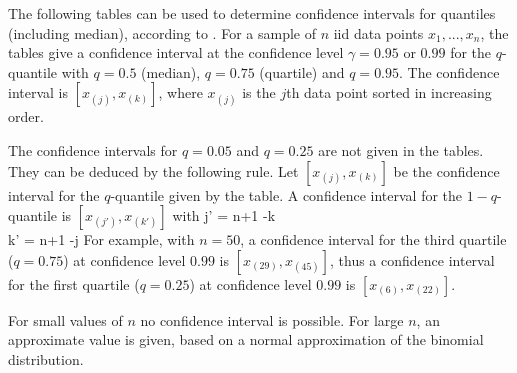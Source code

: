  The following tables can be used to determine confidence
 intervals for quantiles (including median),
 according to
 .
%
For a sample of $n$ iid data points
$x_1,...,x_n$, the tables give a confidence
interval at the confidence level $\gamma=0.95$ or
$0.99$ for the $q$-quantile with $q=0.5$
(median), $q=0.75$ (quartile) and $q=0.95$. The
confidence interval is $[x_{(j)},x_{(k)}]$, where
$x_{(j)}$ is the $j$th data point sorted in
increasing order.

The confidence intervals for $q=0.05$ and $q=0.25$ are not given
in the tables. They can be deduced by the following rule. Let
$[x_{(j)},x_{(k)}]$ be the confidence interval for the
$q$-quantile given by the table.  A confidence interval for the
$1-q$-quantile is $[x_{(j')},x_{(k')}]$ with
 \bearn
 j' = n+1 -k \\
 k' = n+1 -j
 \eearn
 For example, with $n=50$, a confidence interval for the third quartile
 ($q=0.75$) at confidence level $0.99$ is $[x_{(29)},x_{(45)}]$,
 thus a confidence interval for the first quartile ($q=0.25$) at
 confidence level $0.99$ is $[x_{(6)},x_{(22)}]$.

For small values of $n$ no confidence interval is
possible. For large $n$, an approximate value is
given, based on a normal approximation of the
binomial distribution.


